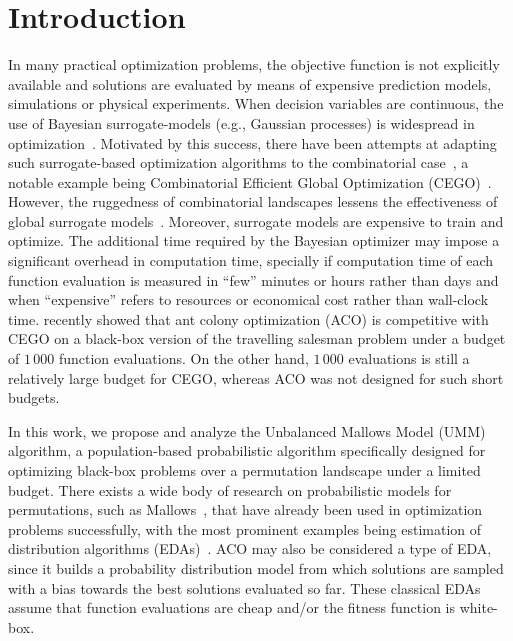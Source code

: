 \documentclass[sigconf,dvipsnames]{acmart}
\begin{document}
\maketitle



\section{Introduction}

In many practical optimization problems, the objective function is not
explicitly available and solutions are evaluated by means of expensive
prediction models, simulations or physical experiments. When decision variables
are continuous, the use of Bayesian surrogate-models (e.g., Gaussian processes)
is widespread in
optimization~\citep{JonSchWel98go,ForKea2009surrogate}. Motivated by this
success, there have been attempts at adapting such surrogate-based optimization
algorithms to the combinatorial case~\cite{MorKat2011:evo}, a notable example being Combinatorial
Efficient Global Optimization
(CEGO)~\citep{ZaeStoBar2014:ppsn,ZaeStoFriFisNauBar2014}. However, the
ruggedness of combinatorial landscapes lessens the effectiveness of global
surrogate models~\citep{EriPeaGar2019scalable}. Moreover, surrogate models are
expensive to train and optimize. The additional time required by the Bayesian
optimizer may impose a significant overhead in computation time, specially if
computation time of each function evaluation is measured in ``few'' minutes or
hours rather than days and when ``expensive'' refers to resources or economical
cost rather than wall-clock time. \citet{PerLopStu2015si} recently showed that
ant colony optimization (ACO) %
is competitive with CEGO
on a black-box version of the travelling salesman problem under a budget of
$1\,000$ function evaluations.  On the other hand, $1\,000$ evaluations is
still a relatively large budget for CEGO, whereas ACO was not designed for such
short budgets.

In this work, we propose and analyze the Unbalanced Mallows Model (UMM) algorithm, a
population-based probabilistic algorithm specifically designed for optimizing
black-box problems over a permutation landscape under a limited budget. There
exists a wide body of research on probabilistic models for permutations, such
as Mallows~\cite{FliVer1986}, that have already been  used in optimization
problems successfully, with the most prominent examples being estimation of
distribution algorithms
(EDAs)~\cite{CebIruMen2014eda}. ACO may also be considered
a type of EDA, since it builds a probability distribution model from which
solutions are sampled with a bias towards the best solutions evaluated so
far. These classical EDAs  assume that function
evaluations are cheap and/or the fitness function is white-box.%
\end{document}
